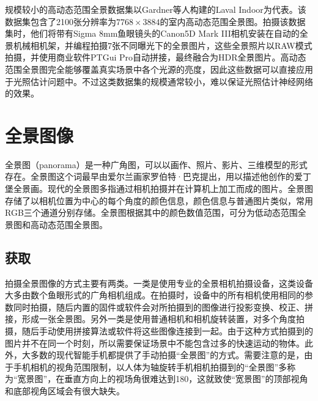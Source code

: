 规模较小的高动态范围全景数据集以Gardner等人构建的Laval Indoor\cite{gardner2017learning}为代表。该数据集包含了2100张分辨率为$7768\times3884$的室内高动态范围全景图。拍摄该数据集时，他们将带有Sigma 8mm鱼眼镜头的Canon5D Mark III相机安装在自动的全景机械相机架，并编程拍摄7张不同曝光下的全景图片，这些全景照片以RAW模式拍摄，并使用商业软件PTGui Pro\cite{ptgui}自动拼接，最终融合为HDR全景图片。高动态范围全景图完全能够覆盖真实场景中各个光源的亮度，因此这些数据可以直接应用于光照估计问题中。不过这类数据集的规模通常较小，难以保证光照估计神经网络的效果。

\section{全景图像}
全景图（panorama）是一种广角图，可以以画作、照片、影片、三维模型的形式存在。全景图这个词最早由爱尔兰画家罗伯特·巴克提出，用以描述他创作的爱丁堡全景画。现代的全景图多指通过相机拍摄并在计算机上加工而成的图片\cite{wikipedia}。全景图存储了以相机位置为中心的每个角度的颜色信息，颜色信息与普通图片类似，常用RGB三个通道分别存储。全景图根据其中的颜色数值范围，可分为低动态范围全景图和高动态范围全景图。

\subsection{获取}
拍摄全景图像的方式主要有两类。一类是使用专业的全景相机拍摄设备，这类设备大多由数个鱼眼形式的广角相机组成。在拍摄时，设备中的所有相机使用相同的参数同时拍摄，随后内置的固件或软件会对所拍摄到的图像进行投影变换、校正、拼接，形成一张全景图。另外一类是使用普通相机和相机旋转装置，对多个角度拍摄，随后手动使用拼接算法或软件将这些图像连接到一起。由于这种方式拍摄到的图片并不在同一个时刻，所以需要保证场景中不能包含过多的快速运动的物体。此外，大多数的现代智能手机都提供了手动拍摄“全景图”的方式。需要注意的是，由于手机相机的视角范围限制，以人体为轴旋转手机相机拍摄到的“全景图”多称为“宽景图”，在垂直方向上的视场角很难达到180\doge，这就致使“宽景图”的顶部视角和底部视角区域会有很大缺失。

